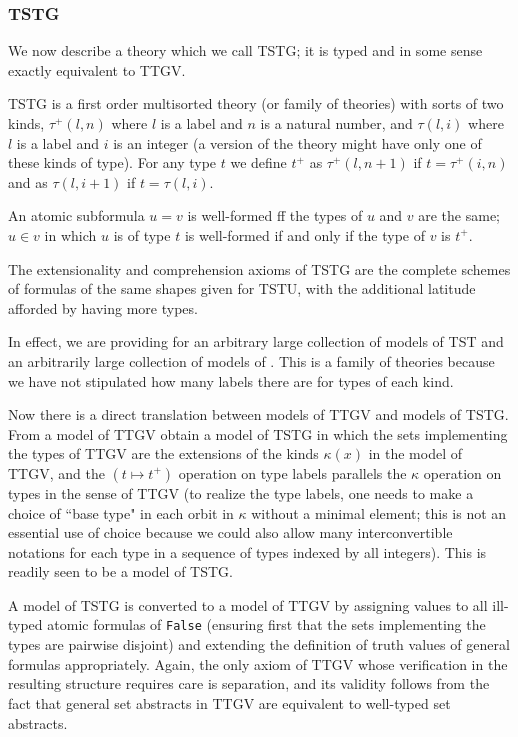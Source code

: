 \documentclass[12pt]{article}
\begin{document}
\subsubsection{TSTG}

We now describe a theory which we call TSTG; it is typed and in some
sense exactly equivalent to TTGV.

TSTG is a first order multisorted theory (or family of theories) with sorts of two kinds, $\tau^+(l,n)$ where $l$ is a label and $n$ is a natural number, and $\tau(l,i)$ where $l$ is a label and $i$ is an integer (a version of the theory might have only one of these kinds of type).  For any type $t$ we define $t^+$ as $\tau^+(l,n+1)$ if $t=\tau^+(i,n)$ and as $\tau(l,i+1)$ if $t=\tau(l,i)$.  

An atomic subformula $u=v$ is well-formed ff the types of $u$ and $v$ are the same; $u \in v$ in which $u$ is of type $t$ is well-formed if and only if the type of $v$ is $t^+$.

The extensionality and comprehension axioms of TSTG are the complete schemes of formulas of the same shapes given for TSTU, with the additional latitude afforded by having more types.

In effect, we are providing for an arbitrary large collection of models of TST and an arbitrarily large collection of models of \TZT.  This is a family of theories because we have not stipulated how many labels there are for types of each kind.

Now there is a direct translation between models of TTGV and models of TSTG.  From a model of TTGV obtain a model of TSTG in which the sets implementing the types of TTGV are the extensions of the kinds $\kappa(x)$ in the model of TTGV, and the $(t \mapsto t^+)$ operation on type labels parallels the $\kappa$ operation on types in the sense of TTGV (to realize the type labels, one needs to make a choice of ``base type" in each orbit in $\kappa$ without a minimal element;  this is not an essential use of choice because we could also allow many interconvertible notations for each type in a sequence of types indexed by all integers).  This is readily seen to be a model of TSTG.

A model of TSTG is converted to a model of TTGV by assigning values to all ill-typed atomic formulas of {\tt False} (ensuring first that the sets implementing the types are pairwise disjoint) and extending the definition of truth values of general formulas appropriately.  Again, the only axiom of TTGV whose verification in the resulting structure requires care is separation, and its validity follows from the fact
that general set abstracts in TTGV are equivalent to well-typed set abstracts.
\end{document}
